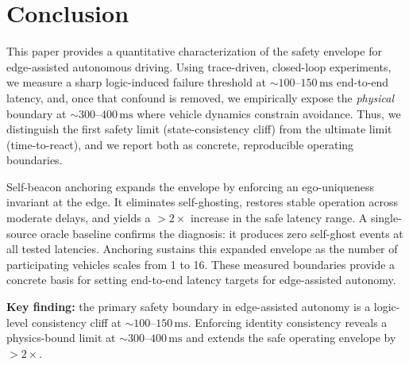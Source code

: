 \section{Conclusion}
\label{sec:conclusion}

This paper provides a quantitative characterization of the safety envelope for edge-assisted autonomous driving. Using trace-driven, closed-loop experiments, we measure a sharp logic-induced failure threshold at \( \sim 100\text{--}150\,\mathrm{ms} \) end-to-end latency, and, once that confound is removed, we empirically expose the \emph{physical} boundary at \( \sim 300\text{--}400\,\mathrm{ms} \) where vehicle dynamics constrain avoidance. Thus, we distinguish the first safety limit (state-consistency cliff) from the ultimate limit (time-to-react), and we report both as concrete, reproducible operating boundaries.

Self-beacon anchoring expands the envelope by enforcing an ego-uniqueness invariant at the edge. It eliminates self-ghosting, restores stable operation across moderate delays, and yields a ${>}\!2{\times}$ increase in the safe latency range. A single-source oracle baseline confirms the diagnosis: it produces zero self-ghost events at all tested latencies. Anchoring sustains this expanded envelope as the number of participating vehicles scales from 1 to 16. These measured boundaries provide a concrete basis for setting end-to-end latency targets for edge-assisted autonomy.

\noindent\textbf{Key finding:} the primary safety boundary in edge-assisted autonomy is a logic-level consistency cliff at ${\sim}100\text{--}150\,\mathrm{ms}$. Enforcing identity consistency reveals a physics-bound limit at ${\sim}300\text{--}400\,\mathrm{ms}$ and extends the safe operating envelope by ${>}\!2{\times}$.